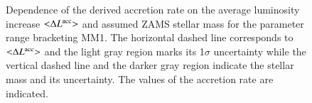 \begin{figure}
    \centering
	\caption{Dependence of the derived accretion rate on the average luminosity increase ${<}\Delta L^{\rm acc}{>}$ and assumed ZAMS stellar mass for the parameter range bracketing MM1. The horizontal dashed line corresponds to ${<}\Delta L^{\rm acc}{>}$ and the light gray region marks its 1$\sigma$ uncertainty while the vertical dashed line and the darker gray region indicate the stellar mass and its uncertainty. The values of the accretion rate are indicated.
	}
 \label{fig:acc}
\end{figure}

